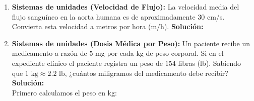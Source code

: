 \documentclass[12pt,letterpaper]{article}
\begin{document}
\begin{enumerate}
    \item \textbf{Sistemas de unidades (Velocidad de Flujo):} La velocidad media del flujo sanguíneo en la aorta humana es de aproximadamente $30$ cm/s. Convierta esta velocidad a metros por hora ($\text{m/h}$).
    \textbf{Solución:} \\

    \item \textbf{Sistemas de unidades (Dosis Médica por Peso):} Un paciente recibe un medicamento a razón de $5$ mg por cada kg de peso corporal. Si en el expediente clínico el paciente registra un peso de $154$ libras (lb). Sabiendo que $1 \text{ kg} \approx 2.2 \text{ lb}$, ¿cuántos miligramos del medicamento debe recibir?
    \textbf{Solución:} \\
    Primero calculamos el peso en kg:

\end{enumerate}
\end{document}
